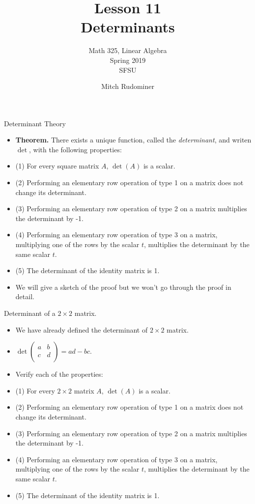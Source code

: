 \documentclass[handout]{beamer}
\title{Lesson 11 \\ Determinants}
\subtitle{Math 325, Linear Algebra \\ Spring 2019 \\ SFSU}
\author{Mitch Rudominer}
\date{}
\begin{document}
\begin{frame}
  \titlepage
\end{frame}


\begin{frame}{Determinant Theory}

\begin{itemize}
\item \textbf{Theorem.} There exists a unique function, called the \emph{determinant}, and writen $\det$, with the following properties:
\item (1) For every square matrix $A$, $\det(A)$ is a scalar.
\item (2) Performing an elementary row operation of type 1 on a matrix does not change its determinant.
\item (3) Performing an elementary row operation of type 2 on a matrix multiplies the determinant by -1.
\item (4) Performing an elementary row operation of type 3 on a matrix, multiplying one of the rows by the scalar $t$,
multiplies the determinant by the same scalar $t$.
\item (5) The determinant of the identity matrix is 1.
\item We will give a sketch of the proof but we won't go through the proof in detail.
\end{itemize}
\end{frame}


\begin{frame}{Determinant of a $2\times 2$ matrix.}

\begin{itemize}
\item We have already defined the determinant of $2\times 2$ matrix.
\item
$
\det
\begin{pmatrix}
a & b \\
c & d \\
\end{pmatrix}
= ad - bc
$.
\item Verify each of the properties:
\item (1) For every $2\times 2$ matrix $A$, $\det(A)$ is a scalar.
\item (2) Performing an elementary row operation of type 1 on a matrix does not change its determinant.
\item (3) Performing an elementary row operation of type 2 on a matrix multiplies the determinant by -1.
\item (4) Performing an elementary row operation of type 3 on a matrix, multiplying one of the rows by the scalar $t$,
multiplies the determinant by the same scalar $t$.
\item (5) The determinant of the identity matrix is 1.
\end{itemize}
\end{frame}
\end{document}
